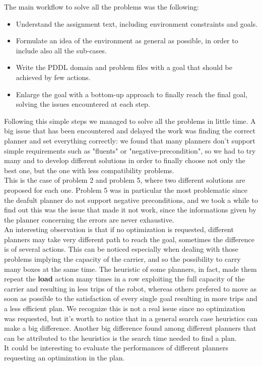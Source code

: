 The main workflow to solve all the problems was the following: 
\begin{itemize}
    \item Understand the assignment text, including environment constraints and goals.
    \item Formulate an idea of the environment as general as possible, in order to include also all the sub-cases.
    \item Write the PDDL domain and problem files with a goal that should be achieved by few actions.
    \item Enlarge the goal with a bottom-up approach to finally reach the final goal, solving the issues encountered at each step. 
\end{itemize}
Following this simple steps we managed to solve all the problems in little time.
A big issue that has been encountered and delayed the work was finding the correct planner and set everything correctly: 
we found that many planners don't support simple requirements such as "fluents" or "negative-precondition", so we had to try many and to develop different
solutions in order to finally choose not only the best one, but the one with less compatibility problems.\\
This is the case of problem 2 and problem 5, where two different solutions are proposed for each one.
Problem 5 was in particular the most problematic since the deafult planner do not support negative preconditions, and we took a while to find out this was the issue that made it not work,
since the informations given by the planner concerning the errors are never exhaustive.\\
An interesting observation is that if no optimization is requested, different planners may take very different path to reach the goal, sometimes the difference is of several actions.
This can be noticed especially when dealing with those problems implying the capacity of the carrier, and so the possibility to carry many boxes at the same time.
The heuristic of some planners, in fact, made them repeat the \textbf{load} action many times in a row exploiting the full capacity of the carrier and resulting in less trips of the robot,
whereas others prefered to move as soon as possible to the satisfaction of every single goal resulting in more trips and a less efficient plan.
We recognize this is not a real issue since no optimization was requested, but it's worth to notice that in a general search case heuristics can make a big difference.
Another big difference found among different planners that can be attributed to the heuristics is the search time needed to find a plan.\\
It could be interesting to evaluate the performances of different planners requesting an optimization in the plan.